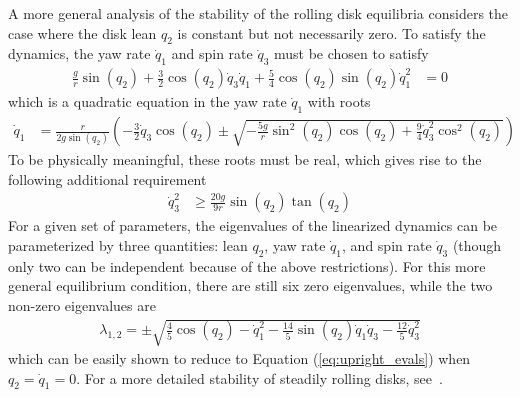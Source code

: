 A more general analysis of the stability of the rolling disk equilibria
considers the case where the disk lean $q_2$ is constant but not necessarily
zero. To satisfy the dynamics, the yaw rate $\dot{q}_1$ and spin rate
$\dot{q}_3$ must be chosen to satisfy
\begin{align}
  \frac{g}{r}\sin{(q_2)}  + \frac{3}{2}\cos{(q_2)} \dot{q}_3 \dot{q}_1 +
  \frac{5}{4}\cos{(q_2)}\sin{(q_2)} \dot{q}_1^2
 &= 0
\end{align}
which is a quadratic equation in the yaw rate $\dot{q}_1$ with roots
\begin{align}
\dot{q}_1 &= \frac{r}{2 g \sin\left(q_{2}\right)} \left( - \frac{3}{2} \dot{q}_{3}\cos\left(q_{2}\right) \pm \sqrt{- \frac{5 g}{r} \sin^{2}\left(q_{2}\right) \cos\left(q_{2}\right) + \frac{9}{4} \dot{q}_{3}^{2} \cos^{2}\left(q_{2}\right)} \right)
\end{align}
To be physically meaningful, these roots must be real, which gives rise to the following additional requirement
\begin{align}
  \dot{q}_3^2 &\geq \frac{20g}{9r}\sin{(q_2)} \tan{(q_2)}
\end{align}
For a given set of parameters, the eigenvalues of the linearized dynamics can be
parameterized by three quantities: lean $q_2$, yaw rate $\dot{q}_1$, and spin
rate $\dot{q}_3$ (though only two can be independent because of the above
restrictions). For this more general equilibrium condition, there are still six
zero eigenvalues, while the two non-zero eigenvalues are
\begin{align}
\lambda_{1,2} = \pm\sqrt{\frac{4}{5} \cos\left(q_{2}\right) - \dot{q}_{1}^{2} -\frac{14}{5} \sin\left(q_{2}\right) \dot{q}_{1} \dot{q}_{3} - \frac{12}{5}\dot{q}_{3}^{2}}
\end{align}
which can be easily shown to reduce to Equation (\ref{eq:upright_evals}) when
$q_2 = \dot{q}_1 = 0$. For a more detailed stability of steadily rolling disks,
see~\cite{OReilly1996,Neimark1972,Kuleshov2001}.

